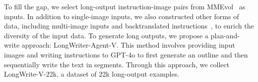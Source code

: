 


To fill the gap, we select long-output instruction-image pairs from MMEvol~\cite{luo2024mmevol} as inputs. In addition to single-image inputs, we also constructed other forms of data, including multi-image inputs and backtranslated instructions~\cite{wang2024weaver}, to enrich the diversity of the input data. To generate long outputs, we propose a plan-and-write approach: LongWriter-Agent-V. This method involves providing input images and writing instructions to GPT-4o to first generate an outline and then sequentially write the text in segments. Through this approach, we collect LongWrite-V-22k, a dataset of 22k long-output examples. 


